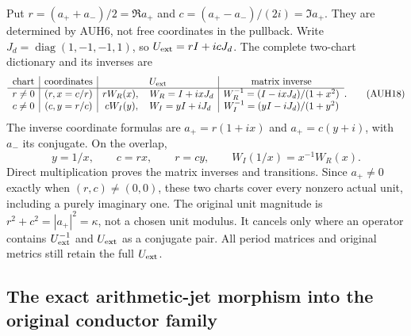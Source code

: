 \documentclass[11pt]{article}
\begin{document}
Put $r=(a_++a_-)/2=\Re a_+$ and
$c=(a_+-a_-)/(2i)=\Im a_+$.
They are determined by AUH6, not free coordinates in the pullback.
Write $J_d=\operatorname{diag}(1,-1,-1,1)$, so
$U_{\rm ext}=rI+icJ_d$.
The complete two-chart dictionary and its inverses are
\[
\begin{array}{c|c|c|c}
 \text{chart}&\text{coordinates}&U_{\rm ext}&\text{matrix inverse}\\\hline
 r\ne0&(r,x=c/r)&rW_R(x),\quad W_R=I+ixJ_d&
 W_R^{-1}=(I-ixJ_d)/(1+x^2)\\
 c\ne0&(c,y=r/c)&cW_I(y),\quad W_I=yI+iJ_d&
 W_I^{-1}=(yI-iJ_d)/(1+y^2)
\end{array}.
 \tag{AUH18}
\]
The inverse coordinate formulas are $a_+=r(1+ix)$ and
$a_+=c(y+i)$, with $a_-$ its conjugate.
On the overlap,
\[
 y=1/x,\qquad c=rx,\qquad r=cy,\qquad
 W_I(1/x)=x^{-1}W_R(x).
 \tag{AUH19}
\]
Direct multiplication proves the matrix inverses and transitions.
Since $a_+\ne0$ exactly when $(r,c)\ne(0,0)$, these two charts
cover every nonzero actual unit, including a purely imaginary one.
The original unit magnitude is $r^2+c^2=|a_+|^2=\kappa$,
not a chosen unit modulus.  It cancels only where an operator
contains $U_{\rm ext}^{-1}$ and $U_{\rm ext}$ as a conjugate pair.
All period matrices and original metrics still retain the full
$U_{\rm ext}$.

\subsection{The exact arithmetic-jet morphism into the original conductor family}
\end{document}
